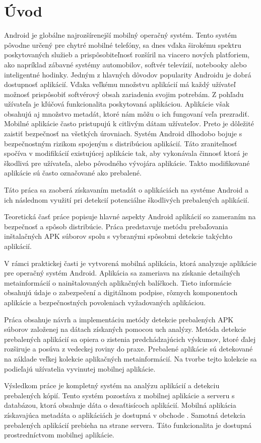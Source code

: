 \chapter{Úvod}
Android je globálne najrozšírenejší mobilný operačný systém. Tento systém pôvodne určený pre chytré mobilné telefóny, sa dnes vďaka širokému spektru poskytovaných služieb a prispôsobiteľnosť rozšíril na viacero nových platforiem, ako napríklad zábavné systémy automobilov, softvér televízií, notebooky alebo inteligentné hodinky. Jedným z hlavných dôvodov popularity Androidu je dobrá dostupnosť aplikácií. Vďaka veľkému množstvu aplikácií má každý užívateľ možnosť prispôsobiť softvérový obsah zariadenia svojim potrebám. Z pohľadu užívateľa je kľúčová funkcionalita poskytovaná aplikáciou. Aplikácie však obsahujú aj množstvo metadát, ktoré nám môžu o ich fungovaní veľa prezradiť. Mobilné aplikácie často pristupujú k citlivým dátam užívateľov. Preto je dôležité zaistiť bezpečnosť na všetkých úrovniach. Systém Android dlhodobo bojuje s bezpečnostným rizikom spojeným s distribúciou aplikácií. Táto zraniteľnosť spočíva v modifikácií existujúcej aplikácie tak, aby vykonávala činnosť ktorá je škodlivá pre užívateľa, alebo pôvodného vývojára aplikácie. Takto modifikované aplikácie sú často označované ako prebalené.

Táto práca sa zaoberá získavaním metadát o aplikáciách na systéme Android a ich následnom využití pri detekcií potenciálne škodlivých prebalených aplikácií.

Teoretická časť práce popisuje hlavné aspekty Android aplikácií so zameraním na bezpečnosť a spôsob distribúcie. Práca predstavuje metódu prebaľovania inštalačných APK súborov spolu s vybranými spôsobmi detekcie takýchto aplikácií.

V rámci praktickej časti je vytvorená mobilná aplikácia, ktorá analyzuje aplikácie pre operačný systém Android. Aplikácia sa zameriava na získanie detailných metainformácií o nainštalovaných aplikačných balíčkoch. Tieto informácie obsahujú údaje o zabezpečení a digitálnom podpise, rôznych komponentoch aplikácie a bezpečnostných povoleniach vyžadovaných aplikáciou.

Práca obsahuje návrh a implementáciu metódy detekcie prebalených APK súborov založenej na dátach získaných pomocou uch analýzy. Metóda detekcie prebalených aplikácií sa opiera o zistenia predchádzajúcich výskumov, ktoré ďalej rozširuje a posúva z vedeckej roviny do praxe. Prebalené aplikácie sú detekované na základe veľkej kolekcie aplikačných metainformácií. Na tvorbe tejto kolekcie sa podieľajú užívatelia vyvinutej mobilnej aplikácie.  

Výsledkom práce je kompletný systém na analýzu aplikácií a detekciu prebalených kópií. Tento systém pozostáva z mobilnej aplikácie a serveru s databázou, ktorá obsahuje dáta o desaťtisícoch aplikácií. Mobilná aplikácia získavajúca metadáta o aplikáciách je dostupná v obchode . Samotná detekcia prebalených aplikácií prebieha na strane servera. Táto funkcionalita je dostupná prostredníctvom mobilnej aplikácie.

